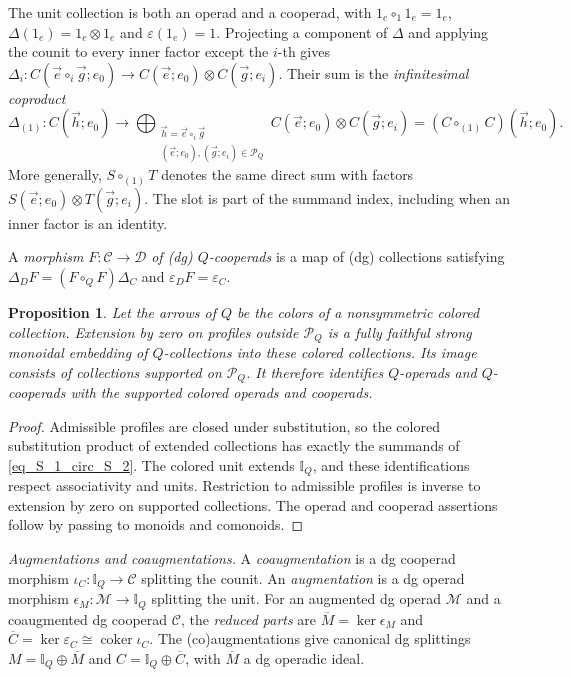 \documentclass[11pt,letterpaper]{article}
\numberwithin{equation}{section}
\theoremstyle{plain}
\newtheorem{prop}[thm]{Proposition}
\theoremstyle{definition}
\theoremstyle{remark}
\begin{document}
The unit collection is both an operad and a cooperad, with
$1_e\circ_1 1_e=1_e$, $\Delta(1_e)=1_e\otimes1_e$ and
$\varepsilon(1_e)=1$.
Projecting a component of $\Delta$ and applying the counit to every
inner factor except the $i$-th gives
$\Delta_i:C(\vec e\circ_i\vec g;e_0)
\to C(\vec e;e_0)\otimes C(\vec g;e_i)$.
Their sum is the \textit{infinitesimal coproduct}
\begin{equation}\label{eq_Delta_(1)}
 \Delta_{(1)}:C(\vec h;e_0)\longrightarrow
 \bigoplus_{\substack{\vec h=\vec e\circ_i\vec g\\
 (\vec e;e_0),(\vec g;e_i)\in\mathcal P_Q}}
 C(\vec e;e_0)\otimes C(\vec g;e_i)
 = (C\circ_{(1)}C)(\vec h;e_0).
\end{equation}
More generally, $S\circ_{(1)}T$ denotes the same direct sum with
factors $S(\vec e;e_0)\otimes T(\vec g;e_i)$.
The slot is part of the summand index, including when an inner factor
is an identity.

A \textit{morphism} $F:\mathscr C\to\mathscr D$ \textit{of (dg) $Q$-cooperads} is a
map of (dg) collections satisfying
$\Delta_DF=(F\circ_QF)\Delta_C$ and $\varepsilon_DF=\varepsilon_C$.

\begin{prop}\label{prop_extension_by_zero}
Let the arrows of $Q$ be the colors of a nonsymmetric
colored collection. Extension by zero on profiles outside $\mathcal P_Q$
is a fully faithful strong monoidal embedding of $Q$-collections into
these colored collections. Its image consists of collections supported
on $\mathcal P_Q$. It therefore identifies $Q$-operads and $Q$-cooperads
with the supported colored operads and cooperads.
\end{prop}
\begin{proof}
Admissible profiles are closed under substitution, so the colored
substitution product of extended collections has exactly the summands
of \eqref{eq_S_1_circ_S_2}. The colored unit extends $\mathbb I_Q$,
and these identifications respect associativity and units.
Restriction to admissible profiles is inverse to extension by zero on
supported collections. The operad and cooperad assertions follow by
passing to monoids and comonoids.
\end{proof}


\medskip
\noindent\textit{Augmentations and coaugmentations.}
A \textit{coaugmentation} is a dg cooperad morphism $\iota_C:\mathbb I_Q\to\mathscr C$ splitting the counit. An \textit{augmentation} is a dg operad morphism $\epsilon_M:\mathscr M\to\mathbb I_Q$ splitting the unit.
For an augmented dg operad $\mathscr M$ and a coaugmented dg cooperad $\mathscr C$, the \textit{reduced parts} are
$\overline M=\ker\epsilon_M$ and $\overline C=\ker\varepsilon_C\cong\operatorname{coker}\iota_C$.
The (co)augmentations give canonical dg splittings
$M=\mathbb I_Q\oplus\overline M$ and $C=\mathbb I_Q\oplus\overline C$, with $\overline M$ a dg operadic ideal.
\end{document}
